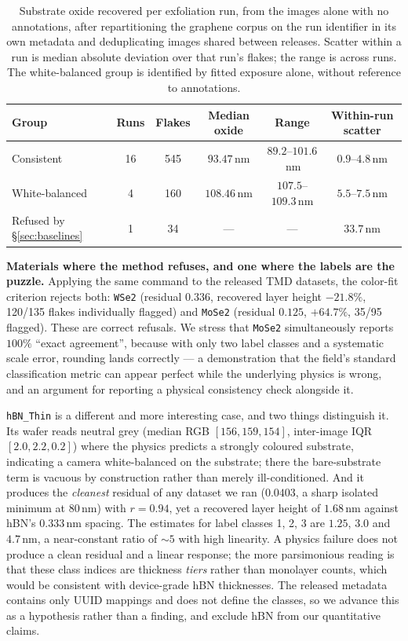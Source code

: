 \documentclass[10pt]{article}
\begin{document}
\begin{table}[h]
\centering\small
\caption{Substrate oxide recovered per exfoliation run, from the images alone with no
annotations, after repartitioning the graphene corpus on the run identifier in its own
metadata and deduplicating images shared between releases. Scatter within a run is
median absolute deviation over that run's flakes; the range is across runs. The
white-balanced group is identified by fitted exposure alone, without reference to
annotations.}
\label{tab:peracq}
\begin{tabular}{lccccc}
\toprule
Group & Runs & Flakes & Median oxide & Range & Within-run scatter \\
\midrule
Consistent          & 16 & 545 & $93.47$\,nm & $89.2$--$101.6$\,nm & $0.9$--$4.8$\,nm \\
White-balanced      & 4  & 160 & $108.46$\,nm & $107.5$--$109.3$\,nm & $5.5$--$7.5$\,nm \\
Refused by \S\ref{sec:baselines} & 1 & 34 & --- & --- & $33.7$\,nm \\
\bottomrule
\end{tabular}
\end{table}

\textbf{Materials where the method refuses, and one where the labels are the puzzle.} Applying the same command to the released TMD datasets, the color-fit criterion rejects both: \texttt{WSe2} (residual $0.336$, recovered layer height $-21.8\%$, 120/135 flakes individually flagged) and \texttt{MoSe2} (residual $0.125$, $+64.7\%$, 35/95 flagged). These are correct refusals. We stress that \texttt{MoSe2} simultaneously reports $100\%$ ``exact agreement'', because with only two label classes and a systematic scale error, rounding lands correctly --- a demonstration that the field's standard classification metric can appear perfect while the underlying physics is wrong, and an argument for reporting a physical consistency check alongside it.

\texttt{hBN\_Thin} is a different and more interesting case, and two things distinguish it. Its wafer reads neutral grey (median RGB $[156,159,154]$, inter-image IQR $[2.0,2.2,0.2]$) where the physics predicts a strongly coloured substrate, indicating a camera white-balanced on the substrate; there the bare-substrate term is vacuous by construction rather than merely ill-conditioned. And it produces the \emph{cleanest} residual of any dataset we ran ($0.0403$, a sharp isolated minimum at 80\,nm) with $r=0.94$, yet a recovered layer height of $1.68$\,nm against hBN's $0.333$\,nm spacing. The estimates for label classes 1, 2, 3 are $1.25$, $3.0$ and $4.7$\,nm, a near-constant ratio of ${\sim}5$ with high linearity. A physics failure does not produce a clean residual and a linear response; the more parsimonious reading is that these class indices are thickness \emph{tiers} rather than monolayer counts, which would be consistent with device-grade hBN thicknesses. The released metadata contains only UUID mappings and does not define the classes, so we advance this as a hypothesis rather than a finding, and exclude hBN from our quantitative claims.
\end{document}
